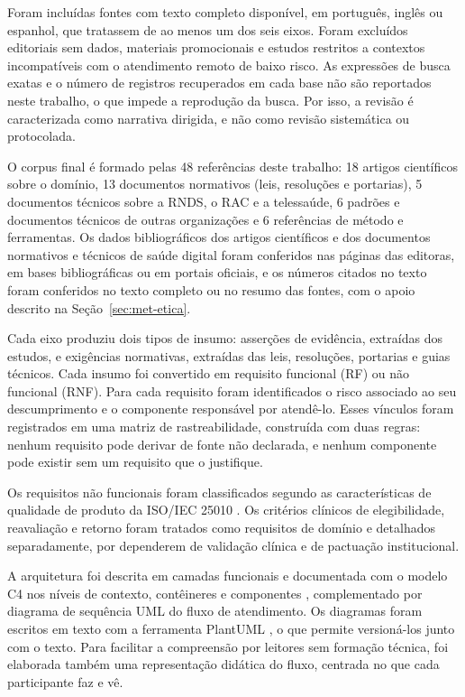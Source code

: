 Foram incluídas fontes com texto completo disponível, em português, inglês ou espanhol, que tratassem de ao menos um dos seis eixos. Foram excluídos editoriais sem dados, materiais promocionais e estudos restritos a contextos incompatíveis com o atendimento remoto de baixo risco. As expressões de busca exatas e o número de registros recuperados em cada base não são reportados neste trabalho, o que impede a reprodução da busca. Por isso, a revisão é caracterizada como narrativa dirigida, e não como revisão sistemática ou protocolada.

O corpus final é formado pelas 48 referências deste trabalho: 18 artigos científicos sobre o domínio, 13 documentos normativos (leis, resoluções e portarias), 5 documentos técnicos sobre a RNDS, o RAC e a telessaúde, 6 padrões e documentos técnicos de outras organizações e 6 referências de método e ferramentas. Os dados bibliográficos dos artigos científicos e dos documentos normativos e técnicos de saúde digital foram conferidos nas páginas das editoras, em bases bibliográficas ou em portais oficiais, e os números citados no texto foram conferidos no texto completo ou no resumo das fontes, com o apoio descrito na Seção~\ref{sec:met-etica}.


Cada eixo produziu dois tipos de insumo: asserções de evidência, extraídas dos estudos, e exigências normativas, extraídas das leis, resoluções, portarias e guias técnicos. Cada insumo foi convertido em requisito funcional (RF) ou não funcional (RNF). Para cada requisito foram identificados o risco associado ao seu descumprimento e o componente responsável por atendê-lo. Esses vínculos foram registrados em uma matriz de rastreabilidade, construída com duas regras: nenhum requisito pode derivar de fonte não declarada, e nenhum componente pode existir sem um requisito que o justifique.

Os requisitos não funcionais foram classificados segundo as características de qualidade de produto da ISO/IEC 25010 \cite{iso25010}. Os critérios clínicos de elegibilidade, reavaliação e retorno foram tratados como requisitos de domínio e detalhados separadamente, por dependerem de validação clínica e de pactuação institucional.


A arquitetura foi descrita em camadas funcionais e documentada com o modelo C4 nos níveis de contexto, contêineres e componentes \cite{brownc4}, complementado por diagrama de sequência UML do fluxo de atendimento. Os diagramas foram escritos em texto com a ferramenta PlantUML \cite{plantuml}, o que permite versioná-los junto com o texto. Para facilitar a compreensão por leitores sem formação técnica, foi elaborada também uma representação didática do fluxo, centrada no que cada participante faz e vê.

